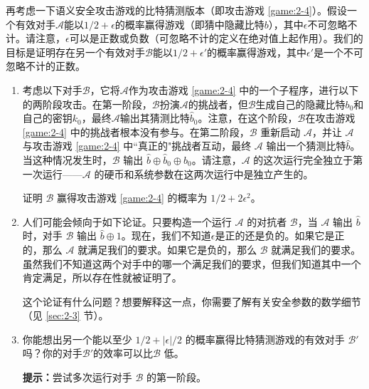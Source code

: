 \begin{exercise}[偏差校正]\label{exer:2-22}
再考虑一下语义安全攻击游戏的比特猜测版本（即攻击游戏 \ref{game:2-4}）。假设一个有效对手$\mathcal{A}$能以$1/2+\epsilon$的概率赢得游戏（即猜中隐藏比特$b$），其中$\epsilon$不可忽略不计。请注意，$\epsilon$可以是正数或负数（可忽略不计的定义在绝对值上起作用）。我们的目标是证明存在另一个有效对手$\mathcal{B}$能以$1/2+\epsilon'$的概率赢得游戏，其中$\epsilon'$是一个不可忽略不计的正数。
\begin{enumerate}[\indent(a)]
	\item 考虑以下对手$\mathcal{B}$，它将$\mathcal{A}$作为攻击游戏 \ref{game:2-4} 中的一个子程序，进行以下的两阶段攻击。在第一阶段，$\mathcal{B}$扮演$\mathcal{A}$的挑战者，但$\mathcal{B}$生成自己的隐藏比特$b_0$和自己的密钥$k_0$，最终$\mathcal{A}$输出其猜测比特$\hat b_0$。注意，在这个阶段，$\mathcal{B}$在攻击游戏 \ref{game:2-4} 中的挑战者根本没有参与。在第二阶段，$\mathcal{B}$ 重新启动 $\mathcal{A}$，并让 $\mathcal{A}$ 与攻击游戏 \ref{game:2-4} 中``真正的"挑战者互动，最终 $\mathcal{A}$ 输出一个猜测比特$\hat b$。当这种情况发生时，$\mathcal{B}$ 输出 $\hat{b}\oplus\hat{b}_0\oplus b_0$。请注意，$\mathcal{A}$ 的这次运行完全独立于第一次运行——$\mathcal{A}$ 的硬币和系统参数在这两次运行中是独立产生的。
	
	\vspace{1pt}
	
	证明 $\mathcal{B}$ 赢得攻击游戏 \ref{game:2-4} 的概率为 $1/2+2\epsilon^2$。
	\item 人们可能会倾向于如下论证。只要构造一个运行 $\mathcal{A}$ 的对抗者 $\mathcal{B}$，当 $\mathcal{A}$ 输出 $\hat b$ 时，对手 $\mathcal{B}$ 输出 $\hat{b}\oplus 1$。现在，我们不知道$\epsilon$是正的还是负的。如果它是正的，那么 $\mathcal{A}$ 就满足我们的要求。如果它是负的，那么 $\mathcal{B}$ 就满足我们的要求。虽然我们不知道这两个对手中的哪一个满足我们的要求，但我们知道其中一个肯定满足，所以存在性就被证明了。
	
	\vspace{1pt}
	
	这个论证有什么问题？想要解释这一点，你需要了解有关安全参数的数学细节（见 \ref{sec:2-3} 节）。
	\item 你能想出另一个能以至少 $1/2+|\epsilon|/2$ 的概率赢得比特猜测游戏的有效对手 $\mathcal{B}'$吗？你的对手$\mathcal{B}'$的效率可以比$\mathcal{B}$ 低。
	
	\vspace{1pt}

	\textbf{提示：}尝试多次运行对手 $\mathcal{B}$ 的第一阶段。
\end{enumerate}
\end{exercise}